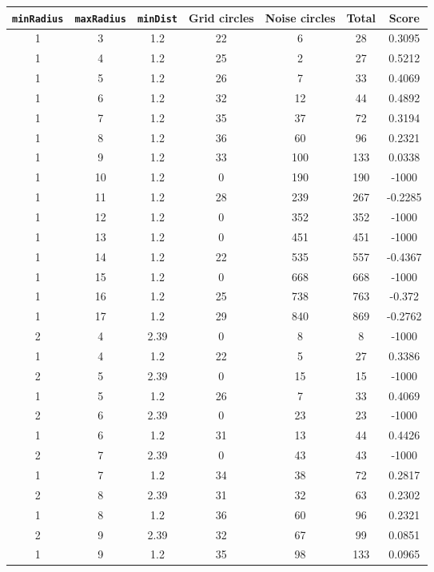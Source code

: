 \documentclass[letterpaper, 12pt]{article}
\begin{document}
\begin{longtable}{|c|c|c|c|c|c|c|}
\hline
\textbf{\texttt{minRadius}} & \textbf{\texttt{maxRadius}} & \textbf{\texttt{minDist}} & \textbf{Grid circles} & \textbf{Noise circles} & \textbf{Total} & \textbf{Score} \\
\hline
1 & 3 & 1.2 & 22 & 6 & 28 & 0.3095 \\
\hline
1 & 4 & 1.2 & 25 & 2 & 27 & 0.5212 \\
\hline
1 & 5 & 1.2 & 26 & 7 & 33 & 0.4069 \\
\hline
1 & 6 & 1.2 & 32 & 12 & 44 & 0.4892 \\
\hline
1 & 7 & 1.2 & 35 & 37 & 72 & 0.3194 \\
\hline
1 & 8 & 1.2 & 36 & 60 & 96 & 0.2321 \\
\hline
1 & 9 & 1.2 & 33 & 100 & 133 & 0.0338 \\
\hline
1 & 10 & 1.2 & 0 & 190 & 190 & -1000 \\
\hline
1 & 11 & 1.2 & 28 & 239 & 267 & -0.2285 \\
\hline
1 & 12 & 1.2 & 0 & 352 & 352 & -1000 \\
\hline
1 & 13 & 1.2 & 0 & 451 & 451 & -1000 \\
\hline
1 & 14 & 1.2 & 22 & 535 & 557 & -0.4367 \\
\hline
1 & 15 & 1.2 & 0 & 668 & 668 & -1000 \\
\hline
1 & 16 & 1.2 & 25 & 738 & 763 & -0.372 \\
\hline
1 & 17 & 1.2 & 29 & 840 & 869 & -0.2762 \\
\hline
2 & 4 & 2.39 & 0 & 8 & 8 & -1000 \\
\hline
1 & 4 & 1.2 & 22 & 5 & 27 & 0.3386 \\
\hline
2 & 5 & 2.39 & 0 & 15 & 15 & -1000 \\
\hline
1 & 5 & 1.2 & 26 & 7 & 33 & 0.4069 \\
\hline
2 & 6 & 2.39 & 0 & 23 & 23 & -1000 \\
\hline
1 & 6 & 1.2 & 31 & 13 & 44 & 0.4426 \\
\hline
2 & 7 & 2.39 & 0 & 43 & 43 & -1000 \\
\hline
1 & 7 & 1.2 & 34 & 38 & 72 & 0.2817 \\
\hline
2 & 8 & 2.39 & 31 & 32 & 63 & 0.2302 \\
\hline
1 & 8 & 1.2 & 36 & 60 & 96 & 0.2321 \\
\hline
2 & 9 & 2.39 & 32 & 67 & 99 & 0.0851 \\
\hline
1 & 9 & 1.2 & 35 & 98 & 133 & 0.0965 \\

\end{longtable}
\end{document}
